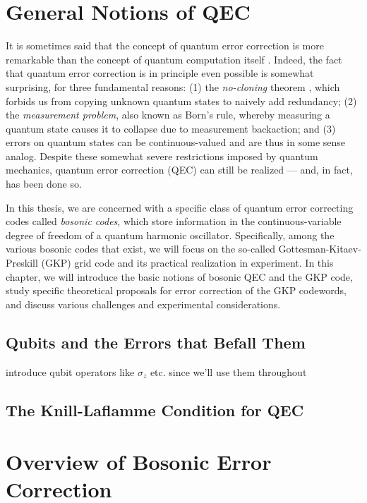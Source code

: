 \section{General Notions of QEC}
It is sometimes said that the concept of quantum error correction is more remarkable than the concept of quantum computation itself \cite{girvin2019QECvideo}. Indeed, the fact that quantum error correction is in principle even possible is somewhat surprising, for three fundamental reasons: (1) the \textit{no-cloning} theorem \cite{ike-and-mike}, which forbids us from copying unknown quantum states to naively add redundancy; (2) the \textit{measurement problem}, also known as Born's rule, whereby measuring a quantum state causes it to collapse due to measurement backaction; and (3) errors on quantum states can be continuous-valued and are thus in some sense analog. Despite these somewhat severe restrictions imposed by quantum mechanics, quantum error correction (QEC) can still be realized --- and, in fact, has been done so.

In this thesis, we are concerned with a specific class of quantum error correcting codes called \textit{bosonic codes}, which store information in the continuous-variable degree of freedom of a quantum harmonic oscillator. Specifically, among the various bosonic codes that exist, we will focus on the so-called Gottesman-Kitaev-Preskill (GKP) grid code and its practical realization in experiment. In this chapter, we will introduce the basic notions of bosonic QEC and the GKP code, study specific theoretical proposals for error correction of the GKP codewords, and discuss various challenges and experimental considerations.


\subsection{Qubits and the Errors that Befall Them}






introduce qubit operators like $\sigma_z$ etc. since we'll use them throughout


\subsection{The Knill-Laflamme Condition for QEC}


\section{Overview of Bosonic Error Correction}
